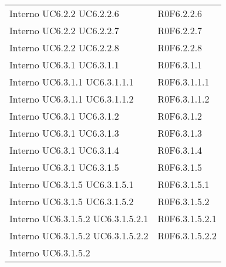 \begin{longtable}{p{2.5cm}!{\VRule[1pt]}p{2.5cm}}
Interno \newline UC6.2.2
 \newline UC6.2.2.6
 & R0F6.2.2.6 \\
Interno \newline UC6.2.2
 \newline UC6.2.2.7
 & R0F6.2.2.7 \\
Interno \newline UC6.2.2
 \newline UC6.2.2.8
 & R0F6.2.2.8 \\
Interno \newline UC6.3.1
 \newline UC6.3.1.1
 & R0F6.3.1.1 \\
Interno \newline UC6.3.1.1
 \newline UC6.3.1.1.1
 & R0F6.3.1.1.1 \\
Interno \newline UC6.3.1.1
 \newline UC6.3.1.1.2
 & R0F6.3.1.1.2 \\
Interno \newline UC6.3.1
 \newline UC6.3.1.2
 & R0F6.3.1.2 \\
Interno \newline UC6.3.1
 \newline UC6.3.1.3
 & R0F6.3.1.3 \\
Interno \newline UC6.3.1
 \newline UC6.3.1.4
 & R0F6.3.1.4 \\
Interno \newline UC6.3.1
 \newline UC6.3.1.5
 & R0F6.3.1.5 \\
Interno \newline UC6.3.1.5
 \newline UC6.3.1.5.1
 & R0F6.3.1.5.1 \\
Interno \newline UC6.3.1.5
 \newline UC6.3.1.5.2
 & R0F6.3.1.5.2 \\
Interno \newline UC6.3.1.5.2
 \newline UC6.3.1.5.2.1
 & R0F6.3.1.5.2.1 \\
Interno \newline UC6.3.1.5.2
 \newline UC6.3.1.5.2.2
 & R0F6.3.1.5.2.2 \\
Interno \newline UC6.3.1.5.2

\end{longtable}
